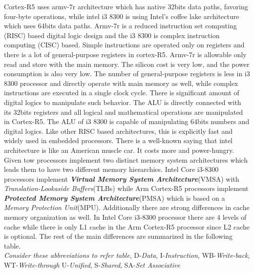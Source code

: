\documentclass[a4paper,11pt]{article}
\begin{document}
Cortex-R5 uses armv-7r architecture which has native 32bits data paths, favoring four-byte operations, while intel i3 8300 is using Intel’s coffee lake architecture which uses 64bits data paths. Armv-7r is a reduced instruction set computing (RISC) based digital logic design and the i3 8300 is complex instruction computing (CISC) based. Simple instructions are operated only on registers and there is a lot of general-purpose registers in cortex-R5. Armv-7r is allowable only read and store with the main memory. The silicon cost is very low, and the power consumption is also very low. The number of general-purpose registers is less in i3 8300 processor and directly operate with main memory as well, while complex instructions are executed in a single clock cycle. There is significant amount of digital logics to manipulate such behavior. The ALU is directly connected with its 32bits registers and all logical and mathematical operations are manipulated in Cortex-R5. The ALU of i3 8300 is capable of manipulating 64bits numbers and digital logics.  Like other RISC based architectures, this is explicitly fast and widely used in embedded processors. There is a well-known saying that intel architecture is like an American muscle car. It costs more and power-hungry.\\

Given tow processors implement two distinct memory system architectures which leads them to have two different memory hierarchies. Intel Core i3-8300 processors implement \textit{\textbf{Virtual Memory System Architecture}}(VMSA) with \textit{Translation-Lookaside Buffers}(TLBs) while Arm Cortex-R5 processors implement \textit{\textbf{Protected Memory System Architecture}}(PMSA) which is based on a \textit{Memory Protection Unit}(MPU). Additionally there are strong differences in cache memory organization as well. In Intel Core i3-8300 processor there are 4 levels of cache while there is only L1 cache  in the Arm Cortex-R5 processor since L2 cache is optional. The rest of the main differences are summarized in the following table.\\ 

{\footnotesize \textit{Consider these abbreviations to refer table},
	D-\textit{Data}, I-\textit{Instruction}, WB-\textit{Write-back}, WT-\textit{Write-through} U-\textit{Unified}, S-\textit{Shared}, SA-\textit{Set Associative}}\\
\end{document}
